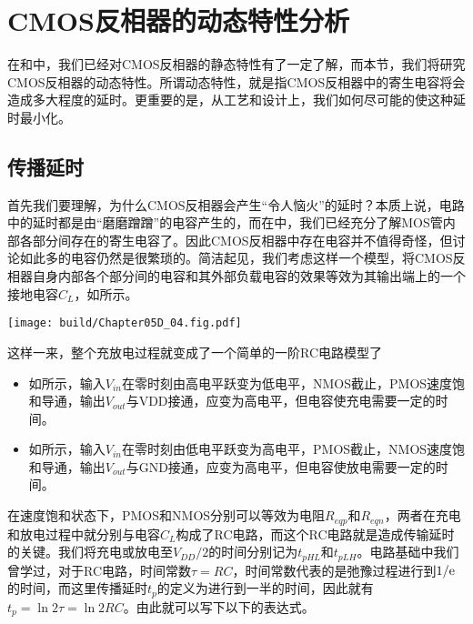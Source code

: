 \section{CMOS反相器的动态特性分析}

在和中，我们已经对CMOS反相器的静态特性有了一定了解，而本节，我们将研究CMOS反相器的动态特性。所谓动态特性，就是指CMOS反相器中的寄生电容将会造成多大程度的延时。更重要的是，从工艺和设计上，我们如何尽可能的使这种延时最小化。

\subsection{传播延时}
首先我们要理解，为什么CMOS反相器会产生“令人恼火”的延时？本质上说，电路中的延时都是由“磨磨蹭蹭”的电容产生的，而在中，我们已经充分了解MOS管内部各部分间存在的寄生电容了。因此CMOS反相器中存在电容并不值得奇怪，但讨论如此多的电容仍然是很繁琐的。简洁起见，我们考虑这样一个模型，将CMOS反相器自身内部各个部分间的电容和其外部负载电容的效果等效为其输出端上的一个接地电容$C_L$，如所示。

\begin{Figure}[CMOS反相器的输出接地电容]
    \texttt{[image: build/Chapter05D\_04.fig.pdf]}
\end{Figure}

这样一来，整个充放电过程就变成了一个简单的一阶RC电路模型了
\begin{itemize}
    \item 如\hspace{0.2em}所示，输入$V_{in}$在零时刻由高电平跃变为低电平，NMOS截止，PMOS速度饱和导通，输出$V_{out}$与VDD接通，应变为高电平，但电容使充电需要一定的时间。
    \item 如所示，输入$V_{in}$在零时刻由低电平跃变为高电平，PMOS截止，NMOS速度饱和导通，输出$V_{out}$与GND接通，应变为高电平，但电容使放电需要一定的时间。
\end{itemize}
在速度饱和状态下，PMOS和NMOS分别可以等效为电阻$R_{eqp}$和$R_{eqn}$，两者在充电和放电过程中就分别与电容$C_L$构成了RC电路，而这个RC电路就是造成传输延时的关键。我们将充电或放电至$V_{DD}/2$的时间分别记为$t_\textit{pHL}$和$t_\textit{pLH}$。电路基础中我们曾学过，对于RC电路，时间常数$\tau=RC$，时间常数代表的是弛豫过程进行到$1/\mathrm{e}$的时间，而这里传播延时$t_p$的定义为进行到一半的时间，因此就有$t_p=\ln 2\tau=\ln 2RC$。由此就可以写下以下的表达式。

